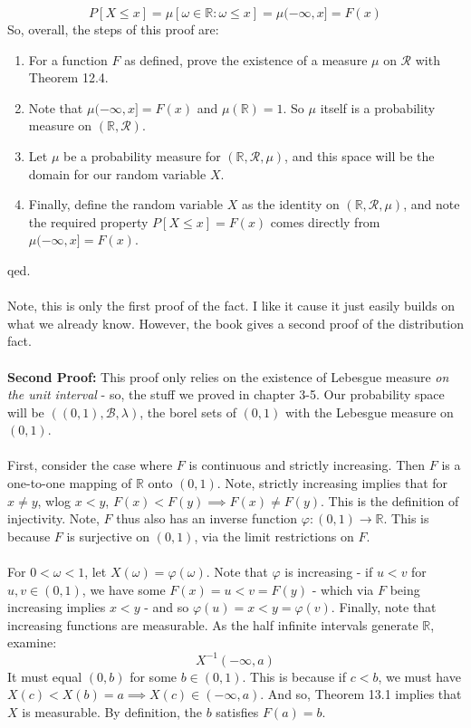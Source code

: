 \documentclass[12pt,a4paper]{article}
\newcommand{\1}[1]{\mathbbm{1}\left\{ #1 \right\}}
\newcommand{\R}{\mathbb{R}}
\newcommand{\bcal}{\mathcal{B}}
\newcommand{\rcal}{\mathcal{R}}
\begin{document}
$$
	P\left[X \leq x\right] = \mu\left[\omega \in \R : \omega \leq x\right] = \mu(-\infty,x] = F(x)
$$
So, overall, the steps of this proof are:
\begin{enumerate}
	\item For a function $F$ as defined, prove the existence of a measure $\mu$ on $\rcal$ with Theorem 12.4.
	\item Note that $\mu(-\infty,x] = F(x)$ and $\mu(\R) = 1$. So $\mu$ itself is a probability measure on $(\R,\rcal)$.
	\item Let $\mu$ be a probability measure for $(\R,\rcal,\mu)$, and this space will be the domain for our random variable $X$.
	\item Finally, define the random variable $X$ as the identity on $(\R,\rcal,\mu)$, and note the required property $P\left[X \leq x\right] = F(x)$ comes directly from $\mu(-\infty,x] = F(x)$.
\end{enumerate}
qed.
\\\\
Note, this is only the first proof of the fact. I like it cause it just easily builds on what we already know. However, the book gives a second proof of the distribution fact.
\\\\
\textbf{Second Proof:} This proof only relies on the existence of Lebesgue measure \textit{on the unit interval} - so, the stuff we proved in chapter 3-5. Our probability space will be $((0,1),\bcal,\lambda)$, the borel sets of $(0,1)$ with the Lebesgue measure on $(0,1)$.
\\\\
First, consider the case where $F$ is continuous and strictly increasing. Then $F$ is a one-to-one mapping of $\R$ onto $(0,1)$. Note, strictly increasing implies that for $x \neq y$, wlog $x < y$, $F(x) < F(y) \implies F(x) \neq F(y)$. This is the definition of injectivity. Note, $F$ thus also has an inverse function $\varphi: (0,1) \to \R$. This is because $F$ is surjective on $(0,1)$, via the limit restrictions on $F$.
\\\\
For $0 < \omega < 1$, let $X(\omega) = \varphi(\omega)$. Note that $\varphi$ is increasing - if $u < v$ for $u, v \in (0,1)$, we have some $F(x) = u < v = F(y)$ - which via $F$ being increasing implies $x < y$ - and so $\varphi(u) = x < y = \varphi(v)$. Finally, note that increasing functions are measurable. As the half infinite intervals generate $\R$, examine:
$$
	X^{-1}(-\infty,a)
$$
It must equal $(0,b)$ for some $b \in (0,1)$. This is because if $c < b$, we must have $X(c) < X(b) = a \implies X(c) \in (-\infty,a)$. And so, Theorem 13.1 implies that $X$ is measurable. By definition, the $b$ satisfies $F(a) = b$. 
\end{document}
